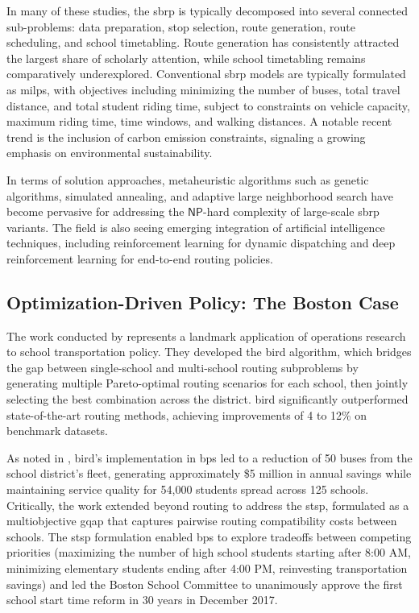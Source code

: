 In many of these studies, the \gls{sbrp} is typically decomposed into several connected sub-problems: data preparation, stop selection, route generation, route scheduling, and school timetabling. Route generation has consistently attracted the largest share of scholarly attention, while school timetabling remains comparatively underexplored. Conventional \gls{sbrp} models are typically formulated as \glspl{milp}, with objectives including minimizing the number of buses, total travel distance, and total student riding time, subject to constraints on vehicle capacity, maximum riding time, time windows, and walking distances. A notable recent trend is the inclusion of carbon emission constraints, signaling a growing emphasis on environmental sustainability.

In terms of solution approaches, metaheuristic algorithms such as genetic algorithms, simulated annealing, and adaptive large neighborhood search have become pervasive for addressing the $\mathsf{NP}$-hard complexity of large-scale \gls{sbrp} variants. The field is also seeing emerging integration of artificial intelligence techniques, including reinforcement learning for dynamic dispatching and deep reinforcement learning for end-to-end routing policies.

\subsection{Optimization-Driven Policy: The Boston Case}

The work conducted by \textcite{bertsimasOptimizingSchoolsStart2019} represents a landmark application of operations research to school transportation policy. They developed the \gls{bird} algorithm, which bridges the gap between single-school and multi-school routing subproblems by generating multiple Pareto-optimal routing scenarios for each school, then jointly selecting the best combination across the district. \Gls{bird} significantly outperformed state-of-the-art routing methods, achieving improvements of 4 to 12\% on benchmark datasets.

As noted in \textcite{bertsimasBusRoutingOptimization2020}, \gls{bird}'s implementation in \gls{bps} led to a reduction of 50 buses from the school district's fleet, generating approximately \$5 million in annual savings while maintaining service quality for 54,000 students spread across 125 schools. Critically, the work extended beyond routing to address the \gls{stsp}, formulated as a multiobjective \gls{gqap} that captures pairwise routing compatibility costs between schools. The \gls{stsp} formulation enabled \gls{bps} to explore tradeoffs between competing priorities (maximizing the number of high school students starting after 8:00 AM, minimizing elementary students ending after 4:00 PM, reinvesting transportation savings) and led the Boston School Committee to unanimously approve the first school start time reform in 30 years in December 2017.

